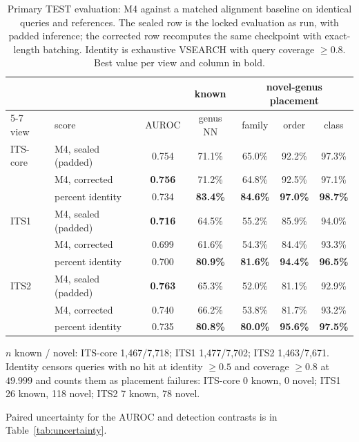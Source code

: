 \begin{table}[htbp]\centering
\begin{threeparttable}
\caption{Primary TEST evaluation: M4 against a matched alignment baseline on identical queries and references. The sealed row is the locked evaluation as run, with padded inference; the corrected row recomputes the same checkpoint with exact-length batching. Identity is exhaustive VSEARCH with query coverage $\geq0.8$. Best value per view and column in bold.}
\label{tab:headtohead}
\small
\begin{tabular}{llccccc}
\toprule
 & & & known & \multicolumn{3}{c}{novel-genus placement} \\
\cmidrule(l){5-7}
view & score & AUROC & genus NN & family & order & class \\
\midrule
ITS-core & M4, sealed (padded) & 0.754 & 71.1\% & 65.0\% & 92.2\% & 97.3\% \\
 & M4, corrected & \textbf{0.756} & 71.2\% & 64.8\% & 92.5\% & 97.1\% \\
 & percent identity & 0.734 & \textbf{83.4\%} & \textbf{84.6\%} & \textbf{97.0\%} & \textbf{98.7\%} \\
\addlinespace
ITS1 & M4, sealed (padded) & \textbf{0.716} & 64.5\% & 55.2\% & 85.9\% & 94.0\% \\
 & M4, corrected & 0.699 & 61.6\% & 54.3\% & 84.4\% & 93.3\% \\
 & percent identity & 0.700 & \textbf{80.9\%} & \textbf{81.6\%} & \textbf{94.4\%} & \textbf{96.5\%} \\
\addlinespace
ITS2 & M4, sealed (padded) & \textbf{0.763} & 65.3\% & 52.0\% & 81.1\% & 92.9\% \\
 & M4, corrected & 0.740 & 66.2\% & 53.8\% & 81.7\% & 93.2\% \\
 & percent identity & 0.735 & \textbf{80.8\%} & \textbf{80.0\%} & \textbf{95.6\%} & \textbf{97.5\%} \\
\bottomrule
\end{tabular}
\begin{tablenotes}\footnotesize
\item $n$ known / novel: ITS-core 1,467/7,718; ITS1 1,477/7,702; ITS2 1,463/7,671. Identity censors queries with no hit at identity $\geq0.5$ and coverage $\geq0.8$ at $49.999$ and counts them as placement failures: ITS-core 0 known, 0 novel; ITS1 26 known, 118 novel; ITS2 7 known, 78 novel.
\item Paired uncertainty for the AUROC and detection contrasts is in Table~\ref{tab:uncertainty}.
\end{tablenotes}
\end{threeparttable}
\end{table}
